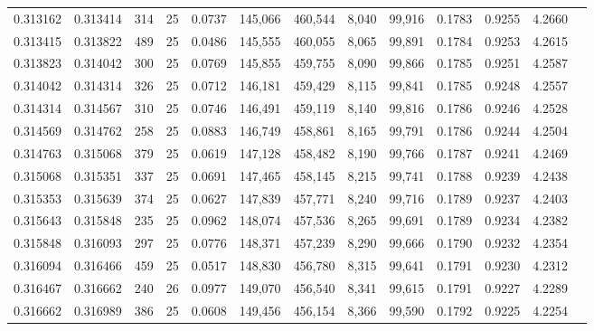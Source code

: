 \begin{tabular}{rrrrrrrrrrrrr}
0.313162 & 0.313414 &   314 &  25 &                                     0.0737 & 145,066 & 460,544 &   8,040 &  99,916 & 0.1783 & 0.9255 & 4.2660 \\
0.313415 & 0.313822 &   489 &  25 &                                     0.0486 & 145,555 & 460,055 &   8,065 &  99,891 & 0.1784 & 0.9253 & 4.2615 \\
0.313823 & 0.314042 &   300 &  25 &                                     0.0769 & 145,855 & 459,755 &   8,090 &  99,866 & 0.1785 & 0.9251 & 4.2587 \\
0.314042 & 0.314314 &   326 &  25 &                                     0.0712 & 146,181 & 459,429 &   8,115 &  99,841 & 0.1785 & 0.9248 & 4.2557 \\
0.314314 & 0.314567 &   310 &  25 &                                     0.0746 & 146,491 & 459,119 &   8,140 &  99,816 & 0.1786 & 0.9246 & 4.2528 \\
0.314569 & 0.314762 &   258 &  25 &                                     0.0883 & 146,749 & 458,861 &   8,165 &  99,791 & 0.1786 & 0.9244 & 4.2504 \\
0.314763 & 0.315068 &   379 &  25 &                                     0.0619 & 147,128 & 458,482 &   8,190 &  99,766 & 0.1787 & 0.9241 & 4.2469 \\
0.315068 & 0.315351 &   337 &  25 &                                     0.0691 & 147,465 & 458,145 &   8,215 &  99,741 & 0.1788 & 0.9239 & 4.2438 \\
0.315353 & 0.315639 &   374 &  25 &                                     0.0627 & 147,839 & 457,771 &   8,240 &  99,716 & 0.1789 & 0.9237 & 4.2403 \\
0.315643 & 0.315848 &   235 &  25 &                                     0.0962 & 148,074 & 457,536 &   8,265 &  99,691 & 0.1789 & 0.9234 & 4.2382 \\
0.315848 & 0.316093 &   297 &  25 &                                     0.0776 & 148,371 & 457,239 &   8,290 &  99,666 & 0.1790 & 0.9232 & 4.2354 \\
0.316094 & 0.316466 &   459 &  25 &                                     0.0517 & 148,830 & 456,780 &   8,315 &  99,641 & 0.1791 & 0.9230 & 4.2312 \\
0.316467 & 0.316662 &   240 &  26 &                                     0.0977 & 149,070 & 456,540 &   8,341 &  99,615 & 0.1791 & 0.9227 & 4.2289 \\
0.316662 & 0.316989 &   386 &  25 &                                     0.0608 & 149,456 & 456,154 &   8,366 &  99,590 & 0.1792 & 0.9225 & 4.2254 \\

\end{tabular}
